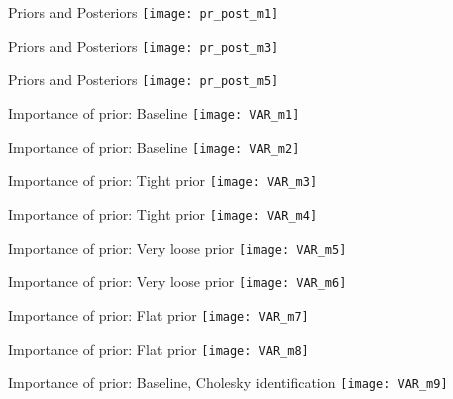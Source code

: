\documentclass{beamer}
\begin{document}
\begin{frame}{Priors and Posteriors}
\texttt{[image: pr\_post\_m1]}
\end{frame}

\begin{frame}{Priors and Posteriors}
\texttt{[image: pr\_post\_m3]}
\end{frame}

\begin{frame}{Priors and Posteriors}
\texttt{[image: pr\_post\_m5]}
\end{frame}

\begin{frame}{Importance of prior: Baseline}
\texttt{[image: VAR\_m1]}
\end{frame}

\begin{frame}{Importance of prior: Baseline}
\texttt{[image: VAR\_m2]}
\end{frame}

\begin{frame}{Importance of prior: Tight prior}
\texttt{[image: VAR\_m3]}
\end{frame}

\begin{frame}{Importance of prior: Tight prior}
\texttt{[image: VAR\_m4]}
\end{frame}

\begin{frame}{Importance of prior: Very loose prior}
\texttt{[image: VAR\_m5]}
\end{frame}

\begin{frame}{Importance of prior: Very loose prior}
\texttt{[image: VAR\_m6]}
\end{frame}

\begin{frame}{Importance of prior: Flat prior}
\texttt{[image: VAR\_m7]}
\end{frame}

\begin{frame}{Importance of prior: Flat prior}
\texttt{[image: VAR\_m8]}
\end{frame}

\begin{frame}{Importance of prior: Baseline, Cholesky identification}
\texttt{[image: VAR\_m9]}
\end{frame}
\end{document}
